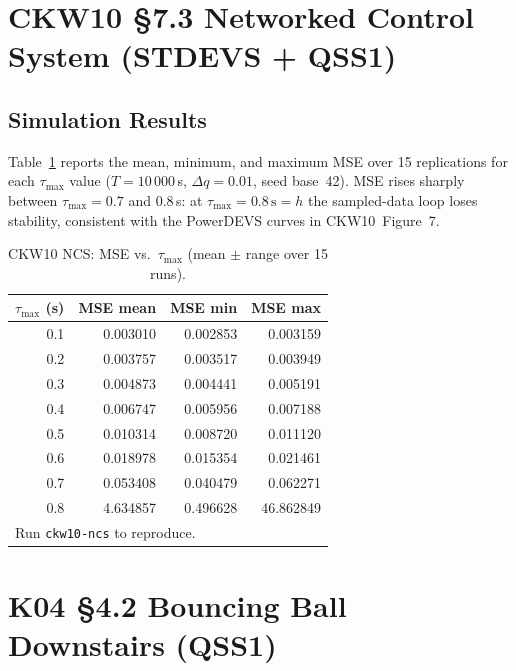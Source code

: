 \documentclass[11pt,a4paper]{article}
\begin{document}
\clearpage
\section{CKW10 §7.3 Networked Control System (STDEVS + QSS1)}
\label{sec:ckw10-ncs}


\subsection*{Simulation Results}
\label{sec:ckw10-ncs-results}

Table~\ref{tab:ckw10-ncs} reports the mean, minimum, and maximum MSE over
15 replications for each $\tau_{\max}$ value ($T=10\,000$\,s, $\Delta q=0.01$,
seed base~42).  MSE rises sharply between $\tau_{\max}=0.7$ and $0.8$\,s:
at $\tau_{\max}=0.8\,\mathrm{s}=h$ the sampled-data loop loses stability,
consistent with the PowerDEVS curves in CKW10~Figure~7.

\begin{table}[h!]
\centering
\caption{CKW10 NCS: MSE vs.\ $\tau_{\max}$ (mean $\pm$ range over 15 runs).}
\label{tab:ckw10-ncs}
\footnotesize
\begin{tabular}{r|rrr}
\toprule
$\tau_{\max}$ (s) & MSE mean & MSE min & MSE max \\
\midrule
0.1 & 0.003010 & 0.002853 & 0.003159 \\
0.2 & 0.003757 & 0.003517 & 0.003949 \\
0.3 & 0.004873 & 0.004441 & 0.005191 \\
0.4 & 0.006747 & 0.005956 & 0.007188 \\
0.5 & 0.010314 & 0.008720 & 0.011120 \\
0.6 & 0.018978 & 0.015354 & 0.021461 \\
0.7 & 0.053408 & 0.040479 & 0.062271 \\
0.8 & 4.634857 & 0.496628 & 46.862849 \\
\bottomrule
\multicolumn{4}{l}{\footnotesize Run \texttt{ckw10-ncs} to reproduce.}
\end{tabular}
\end{table}

\clearpage
\section{K04 §4.2 Bouncing Ball Downstairs (QSS1)}
\label{sec:k04-ball}

\end{document}
